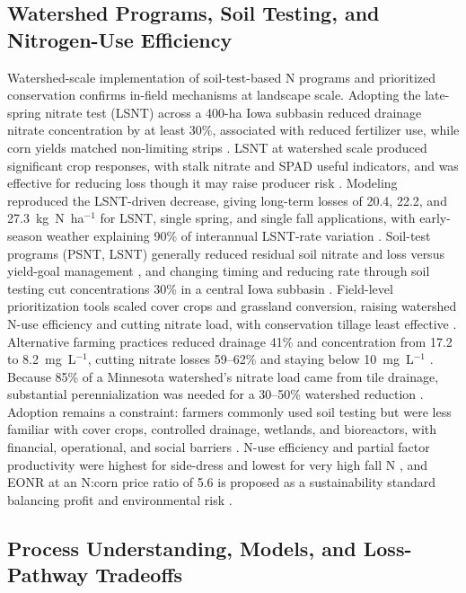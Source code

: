\subsection{Watershed Programs, Soil Testing, and Nitrogen-Use Efficiency}

Watershed-scale implementation of soil-test-based N programs and prioritized conservation confirms in-field mechanisms at landscape scale. Adopting the late-spring nitrate test (LSNT) across a 400-ha Iowa subbasin reduced drainage nitrate concentration by at least 30\%, associated with reduced fertilizer use, while corn yields matched non-limiting strips \parencite{Jaynes2004}. LSNT at watershed scale produced significant crop responses, with stalk nitrate and SPAD useful indicators, and was effective for reducing loss though it may raise producer risk \parencite{Karlen2005}. Modeling reproduced the LSNT-driven decrease, giving long-term losses of 20.4, 22.2, and 27.3~kg~N~ha$^{-1}$ for LSNT, single spring, and single fall applications, with early-season weather explaining 90\% of interannual LSNT-rate variation \parencite{Malone2010}. Soil-test programs (PSNT, LSNT) generally reduced residual soil nitrate and loss versus yield-goal management \parencite{Dinnes2002}, and changing timing and reducing rate through soil testing cut concentrations 30\% in a central Iowa subbasin \parencite{Ritter2015}. Field-level prioritization tools scaled cover crops and grassland conversion, raising watershed N-use efficiency and cutting nitrate load, with conservation tillage least effective \parencite{Makhtoumi2025}. Alternative farming practices reduced drainage 41\% and concentration from 17.2 to 8.2~mg~L$^{-1}$, cutting nitrate losses 59--62\% and staying below 10~mg~L$^{-1}$ \parencite{Oquist2007}. Because 85\% of a Minnesota watershed's nitrate load came from tile drainage, substantial perennialization was needed for a 30--50\% watershed reduction \parencite{Wilson2023}. Adoption remains a constraint: farmers commonly used soil testing but were less familiar with cover crops, controlled drainage, wetlands, and bioreactors, with financial, operational, and social barriers \parencite{David2015}. N-use efficiency and partial factor productivity were highest for side-dress and lowest for very high fall N \parencite{Jaynes2015}, and EONR at an N:corn price ratio of 5.6 is proposed as a sustainability standard balancing profit and environmental risk \parencite{Bandura2025}.

\subsection{Process Understanding, Models, and Loss-Pathway Tradeoffs}

